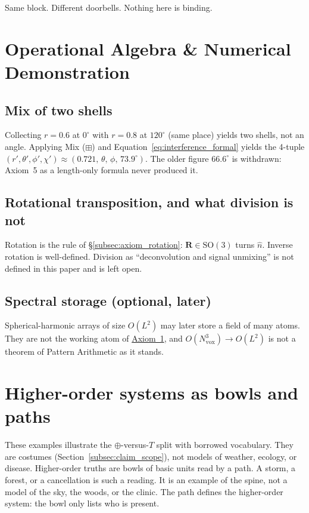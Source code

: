 \documentclass[12pt, a4paper]{article}
\begin{document}
Same block. Different doorbells. Nothing here is binding.

\section{Operational Algebra \& Numerical Demonstration}

\subsection{Mix of two shells}
Collecting $r=0.6$ at $0^\circ$ with $r=0.8$ at $120^\circ$ (same
place) yields two shells, not an angle. Applying Mix ($\boxplus$) and
Equation~\eqref{eq:interference_formal} yields the 4-tuple
$(r',\theta',\phi',\chi')\approx(0.721,\,\theta,\,\phi,\,73.9^\circ)$.
The older figure $66.6^\circ$ is withdrawn: Axiom~5 as a length-only
formula never produced it.

\subsection{Rotational transposition, and what division is not}
\label{subsec:division_open}
Rotation is the rule of \S\ref{subsec:axiom_rotation}: $\mathbf{R}\in\mathrm{SO}(3)$
turns $\hat n$. Inverse rotation is well-defined. Division as
``deconvolution and signal unmixing'' is not defined in this paper and
is left open.

\subsection{Spectral storage (optional, later)}
Spherical-harmonic arrays of size $O(L^2)$ may later store a field of
many atoms. They are not the working atom of
\hyperref[subsec:axiom1]{Axiom~1}, and $O(N_{\mathrm{vox}}^3)\to O(L^2)$ is not a theorem of
Pattern Arithmetic as it stands.

\section{Higher-order systems as bowls and paths}
\label{sec:higher_order}
These examples illustrate the $\oplus$-versus-$T$ split with borrowed
vocabulary. They are costumes
(Section~\ref{subsec:claim_scope}), not models of weather, ecology,
or disease.
Higher-order truths are bowls of basic units read by a path.
A storm, a forest, or a cancellation is such a reading.
It is an example of the spine, not a model of the sky, the woods,
or the clinic. The path defines the higher-order system: the bowl
only lists who is present.
\end{document}
